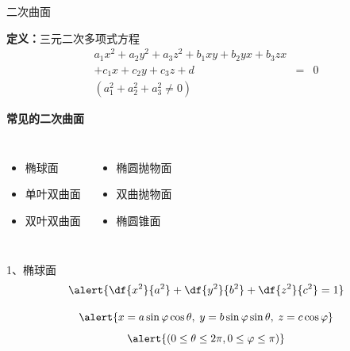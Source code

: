 \begin{frame}{二次曲面}
	\linespread{1.2}\pause 
	\begin{block}{{\bf 定义：}三元二次多项式方程\hfill}
		\vspace{-1em}
		\begin{eqnarray*}
			a_1x^2+a_2y^2+a_3z^2+b_1xy+b_2yx+b_3zx& &\\
			+c_1x+c_2y+c_3z+d & = & 0\\
			(a_1^2+a_2^2+a_3^2\ne 0)& &
		\end{eqnarray*}
	\end{block}\pause 
	{\bf 常见的二次曲面}
	\begin{columns}\pause 
			\begin{itemize}
			  \item 椭球面\pause 
			  \item 单叶双曲面\pause 
			  \item 双叶双曲面\pause 
			\end{itemize}
			\begin{itemize}
			  \item 椭圆抛物面\pause 
			  \item 双曲抛物面\pause 
			  \item 椭圆锥面
			\end{itemize}
	\end{columns}
\end{frame}

\begin{frame}{1、椭球面}
	\linespread{1.2}\pause 
	$$\alert{\df{x^2}{a^2}+\df{y^2}{b^2}+\df{z^2}{c^2}=1}$$\pause 
	\begin{center}
 	\end{center}\pause 
 	$$\alert{x=a\sin\varphi\cos\theta,\;y=b\sin\varphi\sin\theta,\;z=c\cos\varphi}$$
 	$$\alert{(0\leq\theta\leq 2\pi,0\leq\varphi\leq\pi)}$$
\end{frame}


